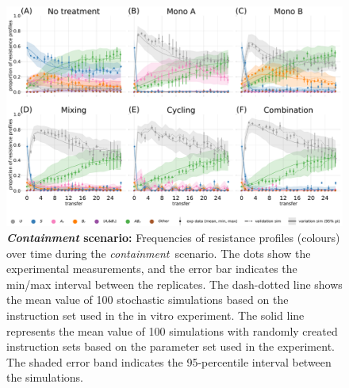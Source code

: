 \begin{figure}[p]
    \centering
    \includegraphics[width = \linewidth]{supplementary_1/figures/20220127_timeplot.pdf}
    \caption{\textbf{\textit{Containment} scenario:}
     Frequencies of resistance profiles (colours) over time during the \textit{containment}~scenario.
     The dots show the experimental measurements, and the error bar indicates the min/max interval between the replicates. 
     The dash-dotted line shows the mean value of 100 stochastic simulations based on the instruction set used in the in vitro experiment. 
     The solid line represents the mean value of 100 simulations with randomly created instruction sets based on the parameter set used in the experiment. 
     The shaded error band indicates the 95-percentile interval between the simulations.}
    \label{fig:exp2}
\end{figure}




